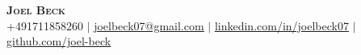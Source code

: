 
\begin{center}
    \textbf{\Huge \scshape Joel Beck} \\ \vspace{2pt}
    \small +491711858260 $|$
    \href{mailto:joelbeck07@gmail.com}{\underline{joelbeck07@gmail.com}} $|$
    \href{https://www.linkedin.com/in/joelbeck07}{\underline{linkedin.com/in/joelbeck07}} $|$
    \href{https://github.com/joel-beck}{\underline{github.com/joel-beck}}
\end{center}